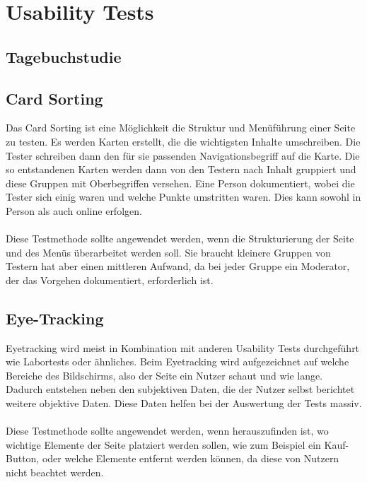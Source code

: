 \section{Usability Tests}
\subsection{Tagebuchstudie}
\subsection{Card Sorting}
Das Card Sorting ist eine Möglichkeit die Struktur und Menüführung einer Seite zu testen.
Es werden Karten erstellt, die die wichtigsten Inhalte umschreiben.
Die Tester schreiben dann den für sie passenden Navigationsbegriff auf die Karte.
Die so entstandenen Karten werden dann von den Testern nach Inhalt gruppiert und diese Gruppen mit Oberbegriffen versehen.
Eine Person dokumentiert, wobei die Tester sich einig waren und welche Punkte umstritten waren.
Dies kann sowohl in Person als auch online erfolgen.\\\\
Diese Testmethode sollte angewendet werden, wenn die Strukturierung der Seite und des Menüs überarbeitet werden soll.
Sie braucht kleinere Gruppen von Testern hat aber einen mittleren Aufwand, da bei jeder Gruppe ein Moderator, der das Vorgehen dokumentiert, erforderlich ist.\autocite[vgl.~][]{usability.de.cardsorting}

\subsection{Eye-Tracking}\label{subsec:eyetracking}
Eyetracking wird meist in Kombination mit anderen Usability Tests durchgeführt wie Labortests oder ähnliches.
Beim Eyetracking wird aufgezeichnet auf welche Bereiche des Bildschirms, also der Seite ein Nutzer schaut und wie lange.
Dadurch entstehen neben den subjektiven Daten, die der Nutzer selbst berichtet weitere objektive Daten.
Diese Daten helfen bei der Auswertung der Tests massiv.\\\\
Diese Testmethode sollte angewendet werden, wenn herauszufinden ist, wo wichtige Elemente der Seite platziert werden sollen, wie zum Beispiel ein Kauf-Button,
oder welche Elemente entfernt werden können, da diese von Nutzern nicht beachtet werden.\autocite[vgl.~][]{usability.de.eyetracking}


